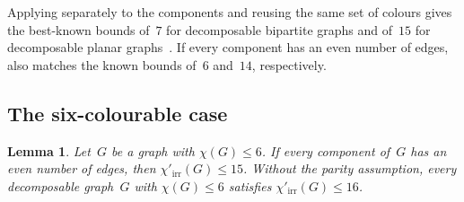 \documentclass[12pt,reqno,a4paper]{amsart}
\newtheorem{lemma}[theorem]{Lemma}
\newcommand{\lir}{\chi'_{\mathrm{irr}}}
\begin{document}
Applying  separately to the components and reusing
the same set of colours gives the best-known bounds of~$7$ for decomposable
bipartite graphs and of~$15$ for decomposable planar
graphs~\cite{LuPrSo18,BeDrNi20}.
If every component has an even number of edges, 
also matches the known bounds of~$6$ and~$14$, respectively.

\subsection{The six-colourable case}

\begin{lemma}\label{lem:even-fifteen}
  Let~$G$ be a graph with $\chi(G) \le 6$.
  If every component of~$G$ has an even number of edges, then $\lir(G) \le 15$.
  Without the parity assumption, every decomposable graph~$G$ with $\chi(G) \le
  6$ satisfies $\lir(G) \le 16$.
\end{lemma}
\end{document}
